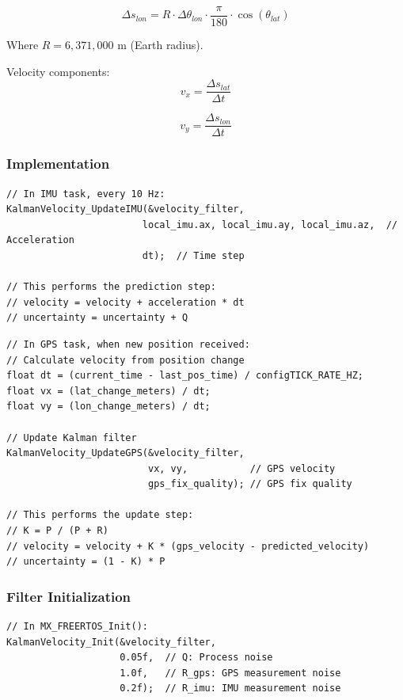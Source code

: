 \documentclass[11pt,a4paper]{article}
\begin{document}
\begin{equation}
\Delta s_{lon} = R \cdot \Delta \theta_{lon} \cdot \frac{\pi}{180} \cdot \cos(\theta_{lat})
\end{equation}

Where $R = 6,371,000$ m (Earth radius).

Velocity components:
\begin{equation}
v_x = \frac{\Delta s_{lat}}{\Delta t}
\end{equation}

\begin{equation}
v_y = \frac{\Delta s_{lon}}{\Delta t}
\end{equation}

\subsubsection{Implementation}
\begin{lstlisting}[caption=Kalman Filter Update with IMU, label=lst:kalmanimu]
// In IMU task, every 10 Hz:
KalmanVelocity_UpdateIMU(&velocity_filter,
                        local_imu.ax, local_imu.ay, local_imu.az,  // Acceleration
                        dt);  // Time step

// This performs the prediction step:
// velocity = velocity + acceleration * dt
// uncertainty = uncertainty + Q
\end{lstlisting}

\begin{lstlisting}[caption=Kalman Filter Update with GPS, label=lst:kalmangps]
// In GPS task, when new position received:
// Calculate velocity from position change
float dt = (current_time - last_pos_time) / configTICK_RATE_HZ;
float vx = (lat_change_meters) / dt;
float vy = (lon_change_meters) / dt;

// Update Kalman filter
KalmanVelocity_UpdateGPS(&velocity_filter,
                         vx, vy,           // GPS velocity
                         gps_fix_quality); // GPS fix quality

// This performs the update step:
// K = P / (P + R)
// velocity = velocity + K * (gps_velocity - predicted_velocity)
// uncertainty = (1 - K) * P
\end{lstlisting}

\subsubsection{Filter Initialization}
\begin{lstlisting}[caption=Kalman Filter Initialization, label=lst:kalmaninit]
// In MX_FREERTOS_Init():
KalmanVelocity_Init(&velocity_filter, 
                    0.05f,  // Q: Process noise
                    1.0f,   // R_gps: GPS measurement noise
                    0.2f);  // R_imu: IMU measurement noise
\end{lstlisting}
\end{document}
